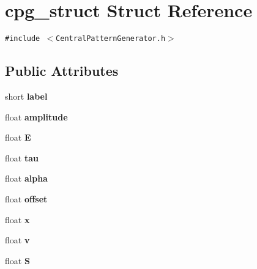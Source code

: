 \hypertarget{structcpg__struct}{
\section{cpg\_\-struct Struct Reference}
\label{structcpg__struct}
}
{\tt \#include $<$CentralPatternGenerator.h$>$}

\subsection*{Public Attributes}
\begin{CompactItemize}
\item 
\hypertarget{structcpg__struct_fc09dd0297d628fb4ca322f3d3f497c0}{
short \textbf{label}}
\label{structcpg__struct_fc09dd0297d628fb4ca322f3d3f497c0}

\item 
\hypertarget{structcpg__struct_8951c08122b8cff7aee3bb18d467ee1e}{
float \textbf{amplitude}}
\label{structcpg__struct_8951c08122b8cff7aee3bb18d467ee1e}

\item 
\hypertarget{structcpg__struct_90866aa62829fd91a6761db8f1af603a}{
float \textbf{E}}
\label{structcpg__struct_90866aa62829fd91a6761db8f1af603a}

\item 
\hypertarget{structcpg__struct_fb8470108253b4e76c771d80bf56ad2a}{
float \textbf{tau}}
\label{structcpg__struct_fb8470108253b4e76c771d80bf56ad2a}

\item 
\hypertarget{structcpg__struct_dbe5a39ff09b16665300752bb62db397}{
float \textbf{alpha}}
\label{structcpg__struct_dbe5a39ff09b16665300752bb62db397}

\item 
\hypertarget{structcpg__struct_b701afc615f537d87bef00c2307d9194}{
float \textbf{offset}}
\label{structcpg__struct_b701afc615f537d87bef00c2307d9194}

\item 
\hypertarget{structcpg__struct_e342b73222772544b3ec6ca14eba2ba4}{
float \textbf{x}}
\label{structcpg__struct_e342b73222772544b3ec6ca14eba2ba4}

\item 
\hypertarget{structcpg__struct_bfe057eb89c718e498614c765815185a}{
float \textbf{v}}
\label{structcpg__struct_bfe057eb89c718e498614c765815185a}

\item 
\hypertarget{structcpg__struct_5730c0944f79a4200fd573999f3a8a2a}{
float \textbf{S}}
\label{structcpg__struct_5730c0944f79a4200fd573999f3a8a2a}

\end{CompactItemize}


